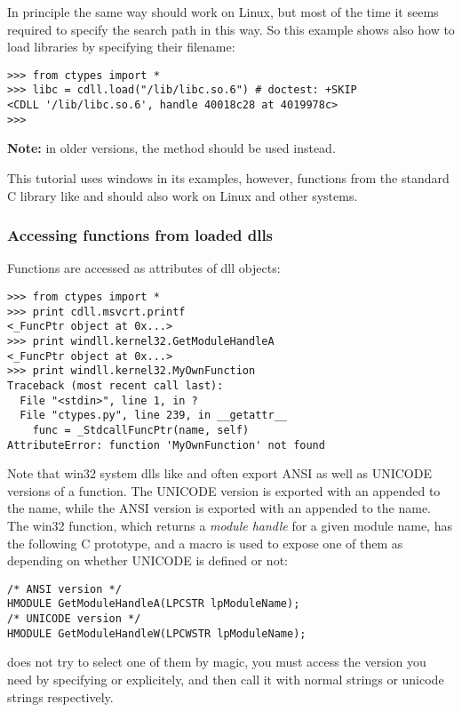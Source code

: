 In principle the same way should work on Linux, but most of the time
it seems required to specify the search path in this way. So this
example shows also how to load libraries by specifying their
filename:
\begin{verbatim}
>>> from ctypes import *
>>> libc = cdll.load("/lib/libc.so.6") # doctest: +SKIP
<CDLL '/lib/libc.so.6', handle 40018c28 at 4019978c>
>>>
\end{verbatim}

\textbf{Note:} in older versions, the  method should be used
instead.

This tutorial uses windows in its examples, however, functions from
the standard C library like  and  should also work
on Linux and other systems.


\subsubsection{Accessing functions from loaded dlls\label{ctypes-accessing-functions-from-loaded-dlls}}

Functions are accessed as attributes of dll objects:
\begin{verbatim}
>>> from ctypes import *
>>> print cdll.msvcrt.printf
<_FuncPtr object at 0x...>
>>> print windll.kernel32.GetModuleHandleA
<_FuncPtr object at 0x...>
>>> print windll.kernel32.MyOwnFunction
Traceback (most recent call last):
  File "<stdin>", line 1, in ?
  File "ctypes.py", line 239, in __getattr__
    func = _StdcallFuncPtr(name, self)
AttributeError: function 'MyOwnFunction' not found
\end{verbatim}

Note that win32 system dlls like  and  often
export ANSI as well as UNICODE versions of a function. The UNICODE
version is exported with an  appended to the name, while the ANSI
version is exported with an  appended to the name. The win32
 function, which returns a \emph{module handle} for a
given module name, has the following C prototype, and a macro is used
to expose one of them as  depending on whether
UNICODE is defined or not:
\begin{verbatim}
/* ANSI version */
HMODULE GetModuleHandleA(LPCSTR lpModuleName);
/* UNICODE version */
HMODULE GetModuleHandleW(LPCWSTR lpModuleName);
\end{verbatim}

 does not try to select one of them by magic, you must
access the version you need by specifying  or
 explicitely, and then call it with normal strings
or unicode strings respectively.

